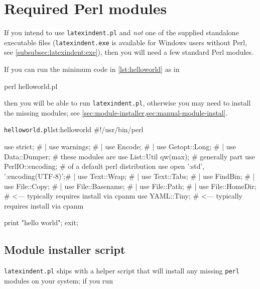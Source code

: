 \appendix
 \section{Required Perl modules}\label{sec:requiredmodules}
  If you intend to use \texttt{latexindent.pl} and \emph{not} one of the supplied
  standalone executable files (\texttt{latexindent.exe} is available for Windows users
  without Perl, see \cref{subsubsec:latexindent:exe}), then you will need a few standard
  Perl modules.

  If you can run the minimum code in \cref{lst:helloworld} as in

  \begin{commandshell}
perl helloworld.pl
  \end{commandshell}

  then you will be able to run \texttt{latexindent.pl}, otherwise you may need to install
  the missing modules; see \cref{sec:module-installer,sec:manual-module-instal}.

  \begin{cmhlistings}[style=tcblatex,language=Perl]{\texttt{helloworld.pl}}{lst:helloworld}
#!/usr/bin/perl

use strict;                         #     |
use warnings;                       #     |
use Encode;                         #     |
use Getopt::Long;                   #     |
use Data::Dumper;                   #  these modules are
use List::Util qw(max);             #  generally part
use PerlIO::encoding;               #  of a default perl distribution
use open ':std', ':encoding(UTF-8)';#     |
use Text::Wrap;                     #     |
use Text::Tabs;                     #     |
use FindBin;                        #     |
use File::Copy;                     #     |
use File::Basename;                 #     |
use File::Path;                     #     |
use File::HomeDir;                  # <--- typically requires install via cpanm
use YAML::Tiny;                     # <--- typically requires install via cpanm

print "hello world";
exit;
\end{cmhlistings}

 \subsection{Module installer script}\label{sec:module-installer}
   \texttt{latexindent.pl} ships with a
  helper script that will install any missing \texttt{perl} modules on your system; if you
  run

